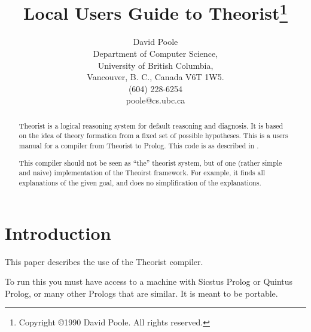 
\pagestyle{myheadings}
\makeindex
\newtheorem{example}{Example}
\newtheorem{algorithm}{Algorithm}
\newtheorem{theorem}{Theorem}
\newtheorem{lemma}[theorem]{Lemma}
\newtheorem{definition}{Definition}
\newtheorem{corollary}[theorem]{Corollary}
\newenvironment{proof}{\begin{quote} {\bf Proof: }}{$\Box$\end{quote}}
\newenvironment{prolog}{\begin{tabbing} \hbox{2cm}\=\hbox{1cm}\=\kill
    }{\end{tabbing}}
\newcommand{\IF}{\ $:-$\\\>}
\newcommand{\AND}{,\\\>}
\title{Local Users Guide to Theorist\thanks{Copyright \copyright 1990
David Poole. All rights reserved.}}
\author{David Poole\\
Department of Computer Science,\\
University of British Columbia,\\
Vancouver, B. C., Canada V6T 1W5.\\
(604) 228-6254\\
poole@cs.ubc.ca}

\maketitle
\begin{abstract}
Theorist \cite{poole:lf,pga,poole:ep,poole:meth} is a logical
reasoning system for default reasoning and diagnosis. It is based on
the idea of theory formation from a fixed set of possible hypotheses.
This is a users manual for a compiler from Theorist to Prolog. This
code is as described in \cite{poole:comp}.

This compiler should not be seen as ``the'' theorist system, but of
one (rather simple and naive) implementation of the Theoirst
framework. For example, it finds all explanations of the given goal,
and does no simplification of the explanations.

\end{abstract}
\tableofcontents
\section{Introduction}
This paper describes the use of the Theorist compiler. 

To run this you must have access to a machine with Sicstus Prolog or
Quintus Prolog, or many other Prologs that are similar. It is meant to
be portable.

